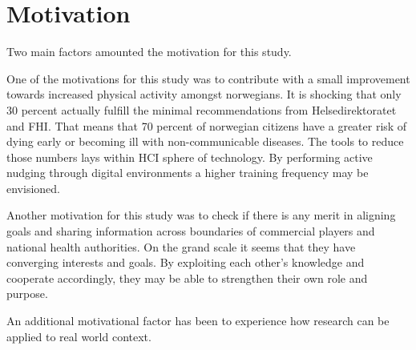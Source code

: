 \chapter*{Motivation} 
Two main factors amounted the motivation for this study. 

One of the motivations for this study was to contribute with a small improvement towards increased physical activity amongst norwegians. It is shocking that only 30 percent actually fulfill the minimal recommendations from Helsedirektoratet and FHI. That means that 70 percent of norwegian citizens have a greater risk of dying early or becoming ill with non-communicable diseases. The tools to reduce those numbers lays within HCI sphere of technology. By performing active nudging through digital environments a higher training frequency may be envisioned. 

Another motivation for this study was to check if there is any merit in aligning goals and sharing information across boundaries of commercial players and national health authorities. On the grand scale it seems that they have converging interests and goals. By exploiting  each other's knowledge and cooperate accordingly, they may be able to strengthen their own role and purpose. 

An additional motivational factor has been to experience how research can be applied to real world context. 



